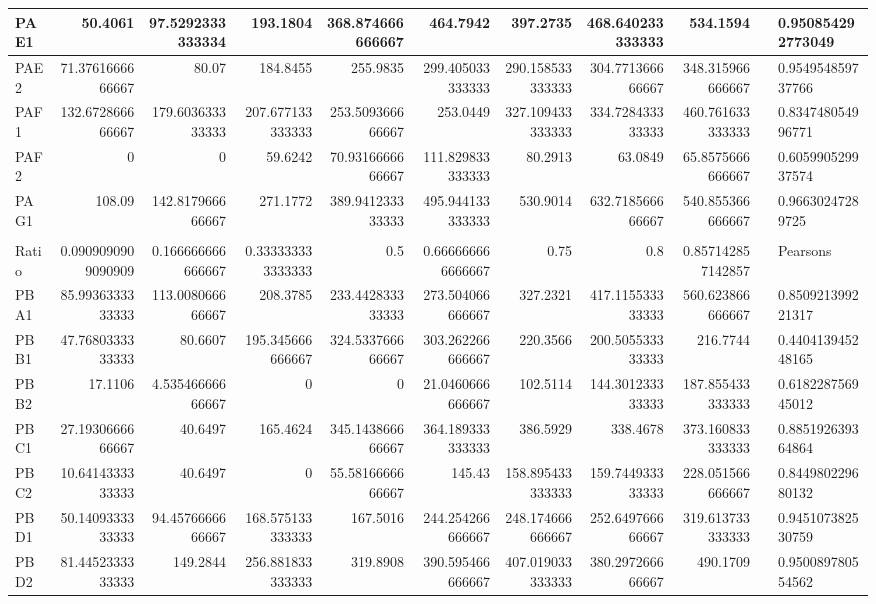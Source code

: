 \begin{table}
{\begin{tabular}{ | l | n{2}{5} | n{2}{5} | n{2}{5} | n{2}{5} | n{2}{5} | n{2}{5} | n{2}{5} | n{2}{5} | l | l | }
	PAE1 & 50.4061 & 97.5292333333334 & 193.1804 & 368.874666666667 & 464.7942 & 397.2735 & 468.640233333333 & 534.1594 &  & 0.950854292773049 \\ \hline
	PAE2 & 71.3761666666667 & 80.07 & 184.8455 & 255.9835 & 299.405033333333 & 290.158533333333 & 304.771366666667 & 348.315966666667 &  & 0.954954859737766 \\ \hline
	PAF1 & 132.672866666667 & 179.603633333333 & 207.677133333333 & 253.509366666667 & 253.0449 & 327.109433333333 & 334.728433333333 & 460.761633333333 &  & 0.834748054996771 \\ \hline
	PAF2 & 0 & 0 & 59.6242 & 70.9316666666667 & 111.829833333333 & 80.2913 & 63.0849 & 65.8575666666667 &  & 0.605990529937574 \\ \hline
	PAG1 & 108.09 & 142.817966666667 & 271.1772 & 389.941233333333 & 495.944133333333 & 530.9014 & 632.718566666667 & 540.855366666667 &  & 0.96630247289725 \\ \hline
	 &  &  &  &  &  &  &  &  &  &  \\ \hline
	Ratio & 0.0909090909090909 & 0.166666666666667 & 0.333333333333333 & 0.5 & 0.666666666666667 & 0.75 & 0.8 & 0.857142857142857 &  & Pearsons \\ \hline
	PBA1 & 85.9936333333333 & 113.008066666667 & 208.3785 & 233.442833333333 & 273.504066666667 & 327.2321 & 417.115533333333 & 560.623866666667 &  & 0.850921399221317 \\ \hline
	PBB1 & 47.7680333333333 & 80.6607 & 195.345666666667 & 324.533766666667 & 303.262266666667 & 220.3566 & 200.505533333333 & 216.7744 &  & 0.440413945248165 \\ \hline
	PBB2 & 17.1106 & 4.53546666666667 & 0 & 0 & 21.0460666666667 & 102.5114 & 144.301233333333 & 187.855433333333 &  & 0.618228756945012 \\ \hline
	PBC1 & 27.1930666666667 & 40.6497 & 165.4624 & 345.143866666667 & 364.189333333333 & 386.5929 & 338.4678 & 373.160833333333 &  & 0.885192639364864 \\ \hline
	PBC2 & 10.6414333333333 & 40.6497 & 0 & 55.5816666666667 & 145.43 & 158.895433333333 & 159.744933333333 & 228.051566666667 &  & 0.844980229680132 \\ \hline
	PBD1 & 50.1409333333333 & 94.4576666666667 & 168.575133333333 & 167.5016 & 244.254266666667 & 248.174666666667 & 252.649766666667 & 319.613733333333 &  & 0.945107382530759 \\ \hline
	PBD2 & 81.4452333333333 & 149.2844 & 256.881833333333 & 319.8908 & 390.595466666667 & 407.019033333333 & 380.297266666667 & 490.1709 &  & 0.950089780554562 \\ \hline

\end{tabular}}
\end{table}
